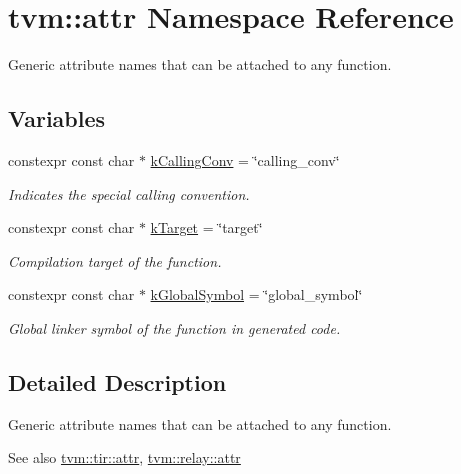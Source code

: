 \hypertarget{namespacetvm_1_1attr}{}\section{tvm\+:\+:attr Namespace Reference}
\label{namespacetvm_1_1attr}


Generic attribute names that can be attached to any function.  


\subsection*{Variables}
\begin{DoxyCompactItemize}
\item 
constexpr const char $\ast$ \hyperlink{namespacetvm_1_1attr_a24f18111e9d98d9ce0229edc0a42e2be}{k\+Calling\+Conv} = \char`\"{}calling\+\_\+conv\char`\"{}
\begin{DoxyCompactList}\small\item\em Indicates the special calling convention. \end{DoxyCompactList}\item 
constexpr const char $\ast$ \hyperlink{namespacetvm_1_1attr_a580ae92d00e34f0a8f0d40395b8d972c}{k\+Target} = \char`\"{}target\char`\"{}
\begin{DoxyCompactList}\small\item\em Compilation target of the function. \end{DoxyCompactList}\item 
constexpr const char $\ast$ \hyperlink{namespacetvm_1_1attr_a7737d03caeeaeac61531ace9a91f7d74}{k\+Global\+Symbol} = \char`\"{}global\+\_\+symbol\char`\"{}
\begin{DoxyCompactList}\small\item\em Global linker symbol of the function in generated code. \end{DoxyCompactList}\end{DoxyCompactItemize}


\subsection{Detailed Description}
Generic attribute names that can be attached to any function. 

\begin{DoxySeeAlso}{See also}
\hyperlink{namespacetvm_1_1tir_1_1attr}{tvm\+::tir\+::attr}, \hyperlink{namespacetvm_1_1relay_1_1attr}{tvm\+::relay\+::attr} 
\end{DoxySeeAlso}


